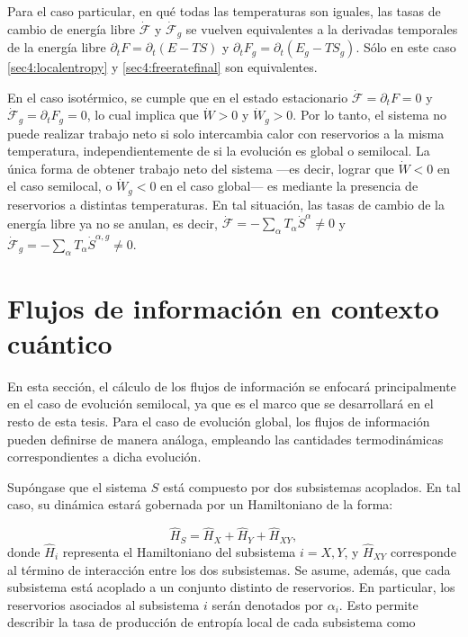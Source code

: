 Para el caso particular, en qué todas las temperaturas son iguales, las tasas de cambio de energía libre $\dot{\mathcal{F}}$ y $\dot{\mathcal{F}}_{g}$ se vuelven equivalentes a la derivadas temporales de la energía libre $\partial_{t}F = \partial_{t}(E-TS)$ y $\partial_{t}F_{g} = \partial_{t}(E_{g}-TS_{g})$. Sólo en este caso \ref{sec4:localentropy} y \ref{sec4:freeratefinal} son equivalentes.

En el caso isotérmico, se cumple que en el estado estacionario $\dot{\mathcal{F}} = \partial_{t}F = 0$ y $\dot{\mathcal{F}}_{g} = \partial_{t}F_{g} = 0$, lo cual implica que $\dot{W} > 0$ y $\dot{W}_{g} > 0$. Por lo tanto, el sistema no puede realizar trabajo neto si solo intercambia calor con reservorios a la misma temperatura, independientemente de si la evolución es global o semilocal. La única forma de obtener trabajo neto del sistema —es decir, lograr que $\dot{W} < 0$ en el caso semilocal, o $\dot{W}_{g} < 0$ en el caso global— es mediante la presencia de reservorios a distintas temperaturas. En tal situación, las tasas de cambio de la energía libre ya no se anulan, es decir, $\dot{\mathcal{F}} = - \sum_{\alpha} T_{\alpha} \dot{S}^{\alpha} \neq 0$ y $\dot{\mathcal{F}}_{g} = - \sum_{\alpha} T_{\alpha} \dot{S}^{\alpha,g} \neq 0$.

\section{Flujos de información en contexto cuántico}
En esta sección, el cálculo de los flujos de información se enfocará principalmente en el caso de evolución semilocal, ya que es el marco que se desarrollará en el resto de esta tesis. Para el caso de evolución global, los flujos de información pueden definirse de manera análoga, empleando las cantidades termodinámicas correspondientes a dicha evolución.

Supóngase que el sistema $S$ está compuesto por dos subsistemas acoplados. En tal caso, su dinámica estará gobernada por un Hamiltoniano de la forma:

\begin{equation*}
    \hat{H}_{S} = \hat{H}_{X} + \hat{H}_{Y} + \hat{H}_{XY}, 
\end{equation*}
donde $\hat{H}_{i}$ representa el Hamiltoniano del subsistema $i=X,Y$, y $\hat{H}_{XY}$ corresponde al término de interacción entre los dos subsistemas. Se asume, además, que cada subsistema está acoplado a un conjunto distinto de reservorios. En particular, los reservorios asociados al subsistema $i$ serán denotados por $\alpha_{i}$. Esto permite describir la tasa de producción de entropía local de cada subsistema como

